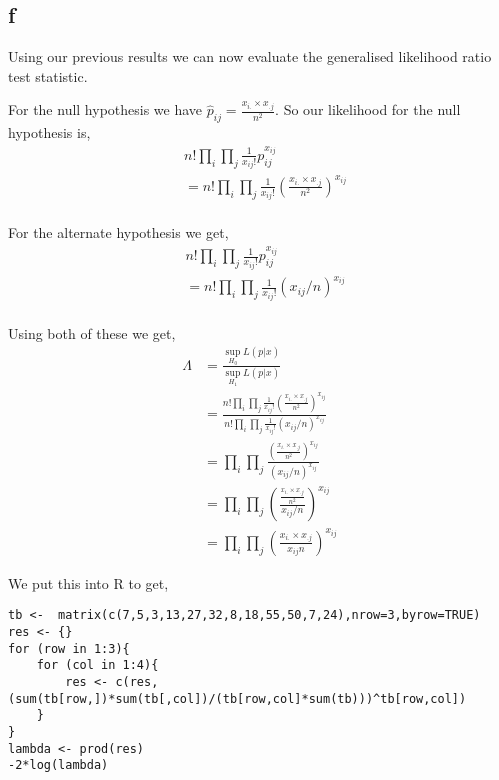 \documentclass{article}
\begin{document}
\subsection{f}
Using our previous results we can now evaluate the generalised likelihood ratio
test statistic.

For the null hypothesis we have
$\hat{p}_{ij} = \frac{x_{i.}\times x_{.j}}{n^2}$.
So our likelihood for the null hypothesis is,
\begin{align*}
    &n! \prod_{i} \prod_{j} \frac{1}{x_{ij}!} p_{ij}^{x_{ij}} \\
    &= n! \prod_{i} \prod_{j}
    \frac{1}{x_{ij}!}
    \left(\frac{x_{i.}\times x_{.j}}{n^2}\right)^{x_{ij}} \\
\end{align*}

For the alternate hypothesis we get,
\begin{align*}
    &n! \prod_{i} \prod_{j} \frac{1}{x_{ij}!} p_{ij}^{x_{ij}} \\
    &= n! \prod_{i} \prod_{j}
    \frac{1}{x_{ij}!}
    \left(x_{ij}/n\right)^{x_{ij}} \\
\end{align*}

Using both of these we get,
\begin{align*}
    \Lambda &= \frac{\sup_{H_0} L(p|x)}{\sup_{H_1} L(p|x)} \\
    &= \frac{n! \prod_{i} \prod_{j}
    \frac{1}{x_{ij}!}
    \left(\frac{x_{i.}\times x_{.j}}{n^2}\right)^{x_{ij}}}
    {n! \prod_{i} \prod_{j}
    \frac{1}{x_{ij}!}
    \left(x_{ij}/n\right)^{x_{ij}}} \\
    &= \prod_{i} \prod_{j}
    \frac{\left(\frac{x_{i.}\times x_{.j}}{n^2}\right)^{x_{ij}}}
    {\left(x_{ij}/n\right)^{x_{ij}}} \\
    &= \prod_{i} \prod_{j}
    \left(\frac{\frac{x_{i.}\times x_{.j}}{n^2}}
    {x_{ij}/n}\right)^{x_{ij}} \\
    &= \prod_{i} \prod_{j}
    \left(\frac{x_{i.}\times x_{.j}}
    {x_{ij}n}\right)^{x_{ij}}
\end{align*}

We put this into R to get,
\begin{verbatim}
tb <-  matrix(c(7,5,3,13,27,32,8,18,55,50,7,24),nrow=3,byrow=TRUE)
res <- {}
for (row in 1:3){
    for (col in 1:4){
        res <- c(res, (sum(tb[row,])*sum(tb[,col])/(tb[row,col]*sum(tb)))^tb[row,col])
    }
}
lambda <- prod(res)
-2*log(lambda)
\end{verbatim}
\end{document}
